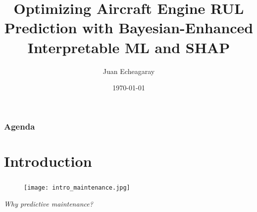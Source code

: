 \documentclass{beamer}
\title{Optimizing Aircraft Engine RUL Prediction with Bayesian-Enhanced Interpretable ML and SHAP}
\author{Juan Echeagaray}
\institute{School of Engineering and Sciences \\ Tecnologico de Monterrey}
\date{\today}
\begin{document}
    \frame{\titlepage}

    \begin{frame}
        \frametitle{Agenda}
        \tableofcontents
    \end{frame}

    \section{Introduction}

        {
            \begin{frame}
                \frametitle{\insertsection}
                \begin{figure}
                    \centering
                    \texttt{[image: intro\_maintenance.jpg]}
                \end{figure}
                \begin{center}
                    \textit{Why predictive maintenance?}
                \end{center}
            \end{frame}
        }
\end{document}
